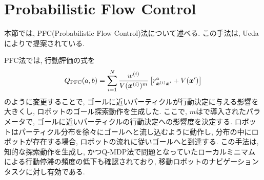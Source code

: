 \section{Probabilistic Flow Control} \label{section:PFC法}
本節では, PFC(Probabilistic Flow Control)法について述べる. 
この手法は, Uedaにより\cite{ueda2015}で提案されている. 

PFC法では, 行動評価の式を
\begin{equation}
\label{equation:pfc}
  Q_{\rm PFC}(a, b) = \sum_{i=1}^{N} \frac{ w^{(i)} }{ V(\boldsymbol{x}^{(i)})^{m} }
                      \left[r^{a}_{\boldsymbol{x}^{(i)} \boldsymbol{x}^{\prime}} + V(\boldsymbol{x}^{\prime}) \right]
\end{equation}
のように変更することで, ゴールに近いパーティクルが行動決定に与える影響を大きくし, ロボットのゴール探索動作を生成した. 
ここで, $m$は\cite{ueda2018searching}で導入されたパラメータで, ゴールに近いパーティクルの行動決定への影響度を決定する. 
ロボットはパーティクル分布を徐々にゴールへと流し込むように動作し, 分布の中にロボットが存在する場合, ロボットの流れに従いゴールへと到達する. 
この手法は, 知的な探索動作を生成し, かつQ-MDP法で問題となっていたローカルミニマムによる行動停滞の頻度の低下も確認されており, 
移動ロボットのナビゲーションタスクに対し有効である. 
